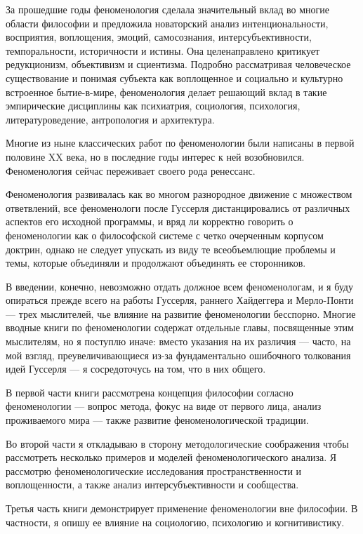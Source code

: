 \documentclass[11pt]{book}
\begin{document}
За прошедшие годы феноменология сделала значительный вклад во многие области философии и предложила новаторский анализ интенциональности, восприятия, воплощения, эмоций, самосознания, интерсубъективности, темпоральности, историчности и истины. Она целенаправлено критикует редукционизм, объективизм и сциентизма. Подробно рассматривая человеческое существование и понимая субъекта как воплощенное и социально и культурно встроенное бытие-в-мире, феноменология делает решающий вклад в такие эмпирические дисциплины как психиатрия, социология, психология, литературоведение, антропология и архитектура.

Многие из ныне классических работ по феноменологии были написаны в первой половине XX века, но в последние годы интерес к ней возобновился. Феноменология сейчас переживает своего рода ренессанс.

Феноменология развивалась как во многом разнородное движение с множеством ответвлений, все феноменологи после Гуссерля дистанцировались от различных аспектов его исходной программы, и вряд ли корректно говорить о феноменологии как о философской системе с четко очерченным корпусом доктрин, однако не следует упускать из виду те всеобъемлющие проблемы и темы, которые объединяли и продолжают объединять ее сторонников.

В введении, конечно, невозможно отдать должное всем феноменологам, и я буду опираться прежде всего на работы Гуссерля, раннего Хайдеггера и Мерло-Понти --- трех мыслителей, чье влияние на развитие феноменологии бесспорно. Многие вводные книги по феноменологии содержат отдельные главы, посвященные этим мыслителям, но я поступлю иначе: вместо указания на их различия --- часто, на мой взгляд, преувеличивающиеся из-за фундаментально ошибочного толкования идей Гуссерля --- я сосредоточусь на том, что в них общего.

В первой части книги рассмотрена концепция философии согласно феноменологии --- вопрос метода, фокус на виде от первого лица, анализ проживаемого мира --- также развитие феноменологической традиции.

Во второй части я откладываю в сторону методологические соображения чтобы рассмотреть несколько примеров и моделей феноменологического анализа. Я рассмотрю феноменологические исследования пространственности и воплощенности, а также анализ интерсубъективности и сообщества.

Третья часть книги демонстрирует применение феноменологии вне философии. В частности, я опишу ее влияние на социологию, психологию и когнитивистику.
\end{document}

